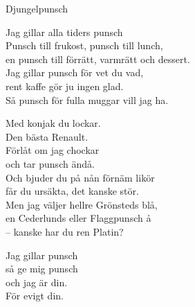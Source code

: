 \begin{song}{Djungelpunsch}
	
	
		
	Jag gillar alla tiders punsch\\
	Punsch till frukost, punsch till lunch,\\
	en punsch till förrätt, varmrätt och dessert.\\
	Jag gillar punsch för vet du vad,\\
	rent kaffe gör ju ingen glad.\\
	Så punsch för fulla muggar vill jag ha.
	
	Med konjak du lockar.\\
	Den bästa Renault.\\
	Förlåt om jag chockar\\
	och tar punsch ändå.\\
	Och bjuder du på nån förnäm likör\\
	får du ursäkta, det kanske stör.\\
	Men jag väljer hellre Grönsteds blå,\\
	en Cederlunds eller Flaggpunsch å\\
	-- kanske har du ren Platin?
	
	Jag gillar punsch\\
	så ge mig punsch\\
	och jag är din.\\
	För evigt din.
	
\end{song}
